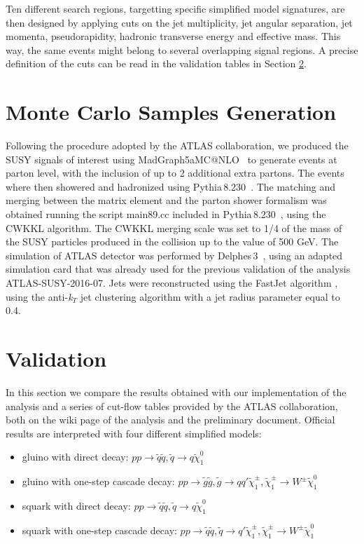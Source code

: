 \documentclass[a4paper,11pt]{article}
\makeatletter
\newcommand{\MG}{{\sc MadGraph5\textunderscore}a{\sc MC@NLO}}
\newcommand{\PY}{{\sc Pythia\,8.230}\xspace}
\newcommand{\DEL}{{\sc Delphes\,3\xspace}}
\makeatother
\begin{document}
	Ten different search regions, targetting specific simplified model signatures, are then designed by applying cuts on the jet multiplicity, jet angular separation, jet momenta, pseudorapidity, hadronic transverse energy and effective mass. This way, the same events might belong to several overlapping signal regions. A precise definition of the cuts can be read in the validation tables in Section \ref{sec::validation}. 
	
	\section{Monte Carlo Samples Generation}
	Following the procedure adopted by the ATLAS collaboration, we produced the SUSY signals of interest using \MG~\cite{Alwall:2014hca} to generate events at parton level, with the inclusion of up to 2 additional extra partons. The events where then showered and hadronized using \PY~\cite{Sjostrand:2014zea}. The matching and merging between the matrix element and the parton shower formalism was obtained running the script main89.cc included in \PY~, using the CWKKL algorithm. The CWKKL merging scale was set to 1/4 of the mass of the SUSY particles produced in the collision up to the value of 500 GeV.  
	The simulation of ATLAS detector was performed by \DEL~\cite{deFavereau:2013fsa}, using an adapted simulation card that was already used for the previous validation of the analysis ATLAS-SUSY-2016-07. Jets were reconstructed using the FastJet algorithm \cite{Cacciari:2011ma}, using the anti-\textit{k}$_T$\cite{Cacciari:2008gp} jet clustering algorithm with a jet radius parameter equal to 0.4.     
	
	\section{Validation}\label{sec::validation}
	In this section we compare the results obtained with our implementation of the analysis and a series of cut-flow tables provided by the ATLAS collaboration, both on the wiki page of the analysis and the preliminary document. Official results are interpreted with four different simplified models:
	\begin{itemize}
	\item gluino with direct decay: $p p \rightarrow \tilde q \tilde q , \tilde q \rightarrow q \tilde \chi _1 ^0$ \
	\item gluino with one-step cascade decay:  $p p \rightarrow \tilde g \tilde g , \tilde g \rightarrow qq'  \tilde \chi _1 ^{\pm} , \tilde \chi _1 ^{\pm} \rightarrow W^{\pm} \tilde \chi _1 ^0$ \
	\item squark with direct decay: $p p \rightarrow \tilde q \tilde q , \tilde q \rightarrow q \tilde \chi _1 ^0$ \
	\item squark with  one-step cascade decay: $p p \rightarrow \tilde q \tilde q , \tilde q \rightarrow q'  \tilde \chi _1 ^{\pm} , \tilde \chi _1 ^{\pm} \rightarrow W^{\pm} \tilde \chi _1 ^0$ \
	\end{itemize}
	
\end{document}
